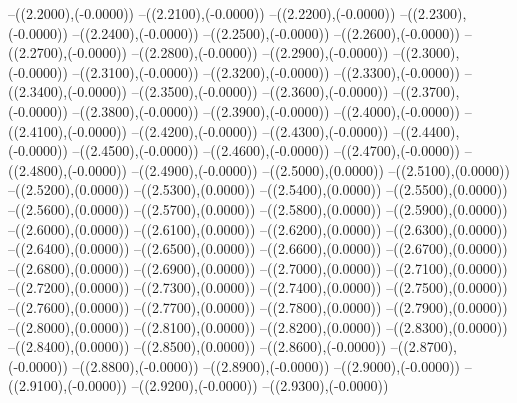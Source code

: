 {	--({\sx*(2.2000)},{\sy*(-0.0000)})
	--({\sx*(2.2100)},{\sy*(-0.0000)})
	--({\sx*(2.2200)},{\sy*(-0.0000)})
	--({\sx*(2.2300)},{\sy*(-0.0000)})
	--({\sx*(2.2400)},{\sy*(-0.0000)})
	--({\sx*(2.2500)},{\sy*(-0.0000)})
	--({\sx*(2.2600)},{\sy*(-0.0000)})
	--({\sx*(2.2700)},{\sy*(-0.0000)})
	--({\sx*(2.2800)},{\sy*(-0.0000)})
	--({\sx*(2.2900)},{\sy*(-0.0000)})
	--({\sx*(2.3000)},{\sy*(-0.0000)})
	--({\sx*(2.3100)},{\sy*(-0.0000)})
	--({\sx*(2.3200)},{\sy*(-0.0000)})
	--({\sx*(2.3300)},{\sy*(-0.0000)})
	--({\sx*(2.3400)},{\sy*(-0.0000)})
	--({\sx*(2.3500)},{\sy*(-0.0000)})
	--({\sx*(2.3600)},{\sy*(-0.0000)})
	--({\sx*(2.3700)},{\sy*(-0.0000)})
	--({\sx*(2.3800)},{\sy*(-0.0000)})
	--({\sx*(2.3900)},{\sy*(-0.0000)})
	--({\sx*(2.4000)},{\sy*(-0.0000)})
	--({\sx*(2.4100)},{\sy*(-0.0000)})
	--({\sx*(2.4200)},{\sy*(-0.0000)})
	--({\sx*(2.4300)},{\sy*(-0.0000)})
	--({\sx*(2.4400)},{\sy*(-0.0000)})
	--({\sx*(2.4500)},{\sy*(-0.0000)})
	--({\sx*(2.4600)},{\sy*(-0.0000)})
	--({\sx*(2.4700)},{\sy*(-0.0000)})
	--({\sx*(2.4800)},{\sy*(-0.0000)})
	--({\sx*(2.4900)},{\sy*(-0.0000)})
	--({\sx*(2.5000)},{\sy*(0.0000)})
	--({\sx*(2.5100)},{\sy*(0.0000)})
	--({\sx*(2.5200)},{\sy*(0.0000)})
	--({\sx*(2.5300)},{\sy*(0.0000)})
	--({\sx*(2.5400)},{\sy*(0.0000)})
	--({\sx*(2.5500)},{\sy*(0.0000)})
	--({\sx*(2.5600)},{\sy*(0.0000)})
	--({\sx*(2.5700)},{\sy*(0.0000)})
	--({\sx*(2.5800)},{\sy*(0.0000)})
	--({\sx*(2.5900)},{\sy*(0.0000)})
	--({\sx*(2.6000)},{\sy*(0.0000)})
	--({\sx*(2.6100)},{\sy*(0.0000)})
	--({\sx*(2.6200)},{\sy*(0.0000)})
	--({\sx*(2.6300)},{\sy*(0.0000)})
	--({\sx*(2.6400)},{\sy*(0.0000)})
	--({\sx*(2.6500)},{\sy*(0.0000)})
	--({\sx*(2.6600)},{\sy*(0.0000)})
	--({\sx*(2.6700)},{\sy*(0.0000)})
	--({\sx*(2.6800)},{\sy*(0.0000)})
	--({\sx*(2.6900)},{\sy*(0.0000)})
	--({\sx*(2.7000)},{\sy*(0.0000)})
	--({\sx*(2.7100)},{\sy*(0.0000)})
	--({\sx*(2.7200)},{\sy*(0.0000)})
	--({\sx*(2.7300)},{\sy*(0.0000)})
	--({\sx*(2.7400)},{\sy*(0.0000)})
	--({\sx*(2.7500)},{\sy*(0.0000)})
	--({\sx*(2.7600)},{\sy*(0.0000)})
	--({\sx*(2.7700)},{\sy*(0.0000)})
	--({\sx*(2.7800)},{\sy*(0.0000)})
	--({\sx*(2.7900)},{\sy*(0.0000)})
	--({\sx*(2.8000)},{\sy*(0.0000)})
	--({\sx*(2.8100)},{\sy*(0.0000)})
	--({\sx*(2.8200)},{\sy*(0.0000)})
	--({\sx*(2.8300)},{\sy*(0.0000)})
	--({\sx*(2.8400)},{\sy*(0.0000)})
	--({\sx*(2.8500)},{\sy*(0.0000)})
	--({\sx*(2.8600)},{\sy*(-0.0000)})
	--({\sx*(2.8700)},{\sy*(-0.0000)})
	--({\sx*(2.8800)},{\sy*(-0.0000)})
	--({\sx*(2.8900)},{\sy*(-0.0000)})
	--({\sx*(2.9000)},{\sy*(-0.0000)})
	--({\sx*(2.9100)},{\sy*(-0.0000)})
	--({\sx*(2.9200)},{\sy*(-0.0000)})
	--({\sx*(2.9300)},{\sy*(-0.0000)})
}
